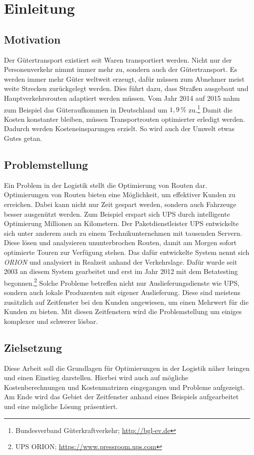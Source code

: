 \chapter{Einleitung}
\label{cha:Einleitung}

\section{Motivation}

Der Gütertransport existiert seit Waren transportiert werden. 
Nicht nur der Personenverkehr nimmt immer mehr zu, sondern auch der Gütertransport. 
Es werden immer mehr Güter weltweit erzeugt, dafür müssen zum Abnehmer meist weite Strecken zurückgelegt werden. 
Dies führt dazu, dass Straßen ausgebaut und Hauptverkehrsrouten adaptiert werden müssen. 
Vom Jahr 2014 auf 2015 nahm zum Beispiel das Güteraufkommen in Deutschland um $1,9\,\%$ zu.\footnote{Bundesverband Güterkraftverkehr; \url{http://bgl-ev.de}} 
Damit die Kosten konstanter bleiben, müssen Transportrouten optimierter erledigt werden.
Dadurch werden Kosteneinsparungen erzielt. 
So wird auch der Umwelt etwas Gutes getan. 

\section{Problemstellung}

Ein Problem in der Logistik stellt die Optimierung von Routen dar. 
Optimierungen von Routen bieten eine Möglichkeit, um effektiver Kunden zu erreichen. 
Dabei kann nicht nur Zeit gespart werden, sondern auch Fahrzeuge besser ausgenützt werden. 
Zum Beispiel erspart sich UPS durch intelligente Optimierung Millionen an Kilometern. 
Der Paketdienstleister UPS entwickelte sich unter anderem auch zu einem Technikunternehmen mit tausenden Servern. 
Diese lösen und analysieren ununterbrochen Routen, damit am Morgen sofort optimierte Touren zur Verfügung stehen. 
Das dafür entwickelte System nennt sich \textit{ORION} und analysiert in Realzeit anhand der Verkehrslage. 
Dafür wurde seit 2003 an diesem System gearbeitet und erst im Jahr 2012 mit dem Betatesting begonnen.\footnote{UPS ORION; \url{https://www.pressroom.ups.com}}
Solche Probleme betreffen nicht nur Auslieferungsdienste wie UPS, sondern auch lokale Produzenten mit eigener Auslieferung. 
Diese sind meistens zusätzlich auf Zeitfenster bei den Kunden angewiesen, um einen Mehrwert für die Kunden zu bieten. 
Mit diesen Zeitfenstern wird die Problemstellung um einiges komplexer und schwerer lösbar. 

\section{Zielsetzung}

Diese Arbeit soll die Grundlagen für Optimierungen in der Logistik näher bringen und einen Einstieg darstellen. 
Hierbei wird auch auf mögliche Kostenberechnungen und Kostenmatrizen eingegangen und Probleme aufgezeigt. 
Am Ende wird das Gebiet der Zeitfenster anhand eines Beispiels aufgearbeitet und eine mögliche Lösung präsentiert. 